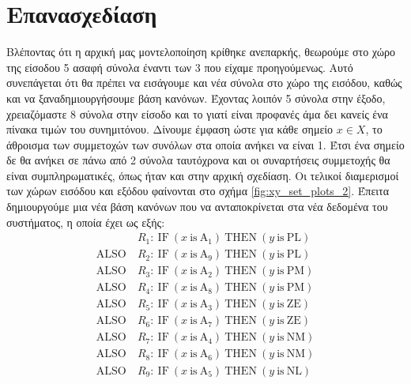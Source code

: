 \documentclass[11pt,a4paper,titlepage, oneside]{article}
\begin{document}
	\section{Επανασχεδίαση}
	Βλέποντας ότι η αρχική μας μοντελοποίηση κρίθηκε ανεπαρκής, θεωρούμε στο χώρο της είσοδου 5 ασαφή σύνολα έναντι των 3 που είχαμε προηγούμενως. Αυτό συνεπάγεται ότι θα πρέπει να εισάγουμε και νέα σύνολα στο χώρο της εισόδου, καθώς και να ξαναδημιουργήσουμε βάση κανόνων. Έχοντας λοιπόν 5 σύνολα στην έξοδο, χρειαζόμαστε 8 σύνολα στην είσοδο και το γιατί είναι προφανές άμα δει κανείς ένα πίνακα τιμών του συνημιτόνου. Δίνουμε έμφαση ώστε για κάθε σημείο $x \in X$, το άθροισμα των συμμετοχών των συνόλων στα οποία ανήκει να είναι 1. Έτσι ένα σημείο δε θα ανήκει σε πάνω από 2 σύνολα ταυτόχρονα και οι συναρτήσεις συμμετοχής θα είναι συμπληρωματικές, όπως ήταν και στην αρχική σχεδίαση. Οι τελικοί διαμερισμοί των χώρων εισόδου και εξόδου φαίνονται στο σχήμα \ref{fig:xy_set_plots_2}. Έπειτα δημιουργούμε μια νέα βάση κανόνων που να ανταποκρίνεται στα νέα δεδομένα του συστήματος, η οποία έχει ως εξής:
	\begin{align*}
		& R_1\colon\ \text{IF}\ \left( x\ \text{is}\ \text{A}_1 \right)\  \text{THEN}\ \left( y\ \text{is}\ \text{PL} \right) \\
		\text{ALSO}\ & R_2\colon\ \text{IF}\ \left( x\ \text{is}\ \text{A}_9 \right)\  \text{THEN}\ \left( y\ \text{is}\ \text{PL} \right) \\
		\text{ALSO}\ & R_3\colon\ \text{IF}\ \left( x\ \text{is}\ \text{A}_2 \right)\  \text{THEN}\ \left( y\ \text{is}\ \text{PM} \right) \\
		\text{ALSO}\ & R_4\colon\ \text{IF}\ \left( x\ \text{is}\ \text{A}_8 \right)\  \text{THEN}\ \left( y\ \text{is}\ \text{PM} \right) \\
		\text{ALSO}\ & R_5\colon\ \text{IF}\ \left( x\ \text{is}\ \text{A}_3 \right)\  \text{THEN}\ \left( y\ \text{is}\ \text{ZE} \right) \\
		\text{ALSO}\ & R_6\colon\ \text{IF}\ \left( x\ \text{is}\ \text{A}_7 \right)\  \text{THEN}\ \left( y\ \text{is}\ \text{ZE} \right) \\
		\text{ALSO}\ & R_7\colon\ \text{IF}\ \left( x\ \text{is}\ \text{A}_4 \right)\  \text{THEN}\ \left( y\ \text{is}\ \text{NM} \right) \\
		\text{ALSO}\ & R_8\colon\ \text{IF}\ \left( x\ \text{is}\ \text{A}_6 \right)\  \text{THEN}\ \left( y\ \text{is}\ \text{NM} \right) \\
		\text{ALSO}\ & R_9\colon\ \text{IF}\ \left( x\ \text{is}\ \text{A}_5 \right)\  \text{THEN}\ \left( y\ \text{is}\ \text{NL} \right)
	\end{align*}
	
\end{document}
